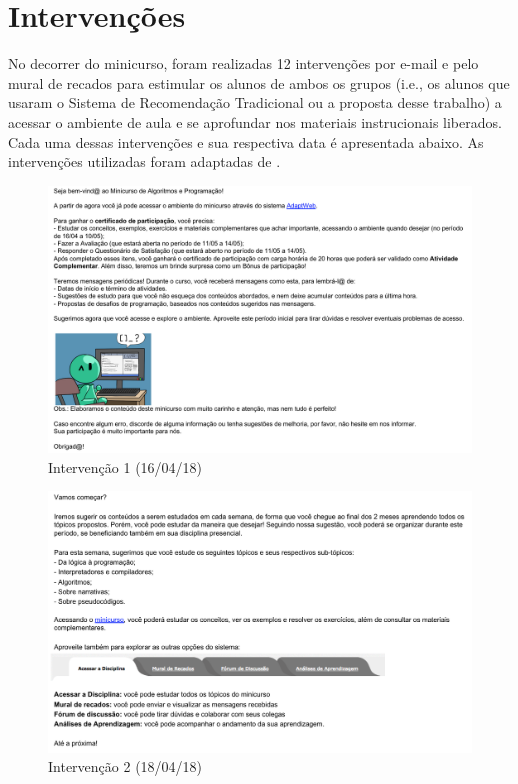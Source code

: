 \chapter{Intervenções}\label{ane:intervencoes}

No decorrer do minicurso, foram realizadas 12 intervenções por e-mail e pelo mural
de recados para estimular os alunos de ambos os grupos (i.e., os alunos que usaram o Sistema de Recomendação Tradicional
ou a proposta desse trabalho) a acessar o ambiente de aula e se aprofundar nos materiais instrucionais
liberados. Cada uma dessas intervenções e sua respectiva data é apresentada abaixo. As intervenções utilizadas foram adaptadas
de .

\begin{figure}[htb]
  \caption{\label{fig:intervencao-1}Intervenção 1 (16/04/18)}
  \begin{center}
      \includegraphics[scale=0.6]{./Figuras/intervencao-1.png}
  \end{center}
\end{figure}

\begin{figure}[htb]
  \caption{\label{fig:intervencao-2}Intervenção 2 (18/04/18)}
  \begin{center}
      \includegraphics[scale=0.6]{./Figuras/intervencao-2.png}
  \end{center}
\end{figure}

